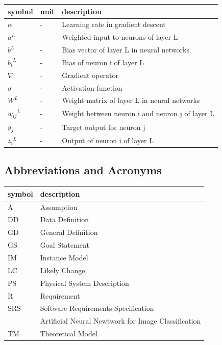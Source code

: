 \documentclass[12pt]{article}
\begin{document}
\renewcommand{\arraystretch}{1.2}
\noindent \begin{longtable*}{l l p{12cm}} \toprule
\textbf{symbol} & \textbf{unit} & \textbf{description}\\
\midrule 
$\alpha$ & \si[per-mode=symbol] {-} & Learning rate in gradient descent
\\
$a^L$ & \si[per-mode=symbol] {-} & Weighted input to neurons of layer L
\\ 
$b^L$ & \si[per-mode=symbol] {-} & Bias vector of layer L in neural networks
\\
${b_{i}}^L$ & \si[per-mode=symbol] {-} & Bias of neuron i of layer L
\\
$\nabla$ & \si[per-mode=symbol] {-} & Gradient operator
\\
$\sigma$ & \si[per-mode=symbol] {-} & Activation function
\\
$W^L$ & \si[per-mode=symbol] {-} & Weight matrix of layer L in neural networks
\\ 
${w_{ij}}^L$ & \si[per-mode=symbol] {-} & Weight between neuron i and neuron j of layer L
\\ 
$y_j$ & \si[per-mode=symbol] {-} & Target output for neuron j 
\\ 
${z_{i}}^L$ & \si[per-mode=symbol] {-} & Output of neuron i of layer L
\\ 
\bottomrule
\end{longtable*}

\subsection{Abbreviations and Acronyms}

\renewcommand{\arraystretch}{1.2}
\begin{tabular}{l l} 
  \toprule		
  \textbf{symbol} & \textbf{description}\\
  \midrule 
  A & Assumption\\
  DD & Data Definition\\
  GD & General Definition\\
  GS & Goal Statement\\
  IM & Instance Model\\
  LC & Likely Change\\
  PS & Physical System Description\\
  R & Requirement\\
  SRS & Software Requirements Specification\\
  \progname{} & Artificial Neural Newtwork for Image Classification\\
  TM & Theoretical Model\\
  \bottomrule
\end{tabular}\\
\end{document}
